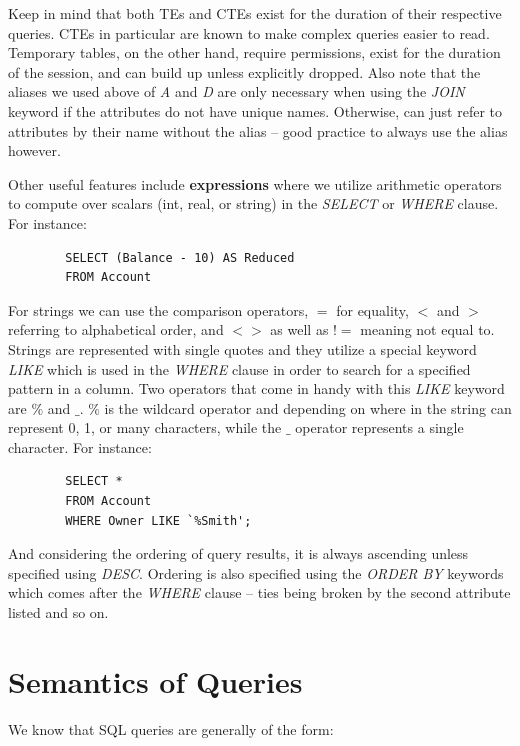 \documentclass{article}
\begin{document}
Keep in mind that both TEs and CTEs exist for the duration of their respective queries. CTEs in particular are known to make complex queries easier to read. Temporary tables, on the other hand, require permissions, exist for the duration of the session, and can build up unless explicitly dropped.
Also note that the aliases we used above of \textit{A} and \textit{D} are only necessary when using the \textit{JOIN} keyword if the attributes do not have unique names. Otherwise, can just refer to attributes by their name without the alias -- good practice to always use the alias however.

Other useful features include \textbf{expressions} where we utilize arithmetic operators to compute over scalars (int, real, or string) in the \textit{SELECT} or \textit{WHERE} clause. For instance:

\begin{tcolorbox}
    \begin{verbatim}
        SELECT (Balance - 10) AS Reduced
        FROM Account
    \end{verbatim}
\end{tcolorbox}

For strings we can use the comparison operators, $=$ for equality, $<$ and $>$ referring to alphabetical order, and $<>$ as well as $!=$ meaning not equal to. Strings are represented with single quotes and they utilize a special keyword \textit{LIKE} which is used in the \textit{WHERE} clause in order to search for a specified pattern in a column. Two operators that come in handy with this \textit{LIKE} keyword are $\%$ and $\_$. $\%$ is the wildcard operator and depending on where in the string can represent 0, 1, or many characters, while the $\_$ operator represents a single character. For instance:

\begin{tcolorbox}
    \begin{verbatim}
        SELECT *
        FROM Account
        WHERE Owner LIKE `%Smith';
    \end{verbatim}
\end{tcolorbox}

And considering the ordering of query results, it is always ascending unless specified using \textit{DESC}. Ordering is also specified using the \textit{ORDER BY} keywords which comes after the \textit{WHERE} clause -- ties being broken by the second attribute listed and so on.

\section{Semantics of Queries}
We know that SQL queries are generally of the form:
\end{document}

